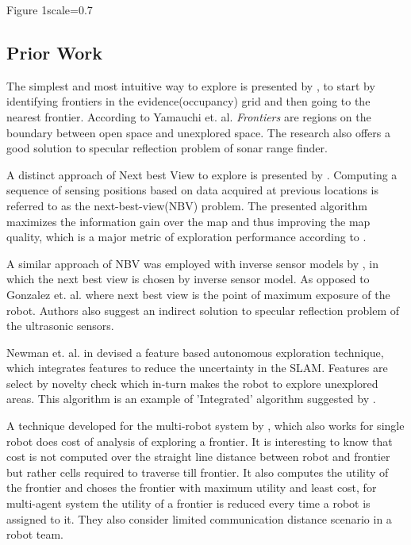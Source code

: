 {Figure 1}{scale=0.7}

\subsection{Prior Work}
\label{sec:priorwork}
The simplest and most intuitive way to explore is presented by \cite{Yamauchi1997}, to start by
identifying frontiers in the evidence(occupancy) grid and then going to the nearest frontier.
According to Yamauchi et. al. \cite{Yamauchi1997} \textit{Frontiers} are regions on the boundary
between open space and unexplored space. The research also offers a good solution to specular
reflection problem of sonar range finder.\par

A distinct approach of Next best View to explore is presented by \cite{Gonzalez-Banos2002}.
Computing a sequence of sensing positions based on data acquired at previous locations is referred
to as the next-best-view(NBV) problem. The presented algorithm maximizes the information gain over
the map and thus improving the map quality, which is a major metric of exploration performance
according to \cite{Yan2015}.\par

A similar approach of NBV was employed with inverse sensor models by \cite{Grabowski2003}, in which
the next best view is chosen by inverse sensor model. As opposed to Gonzalez et. al. where next best
view is the point of maximum exposure of the robot. Authors also suggest an indirect solution to
specular reflection problem of the ultrasonic sensors.\par

Newman et. al. in \cite{Newman2003} devised a feature based autonomous exploration technique, which
integrates features to reduce the uncertainty in the SLAM. Features are select by novelty check
which in-turn makes the robot to explore unexplored areas. This algorithm is an example of
'Integrated' algorithm suggested by \cite{Juliae2012}.\par

A technique developed for the multi-robot system by \cite{Burgard2005}, which also works for single robot does
cost of analysis of exploring a frontier. It is interesting to know that cost is not computed over
the straight line distance between robot and frontier but rather cells required to traverse till
frontier. It also computes the utility of the frontier and choses the frontier with maximum utility
and least cost, for multi-agent system the utility of a frontier is reduced every time a robot is
assigned to it. They also consider limited communication distance scenario in a robot team.\par

